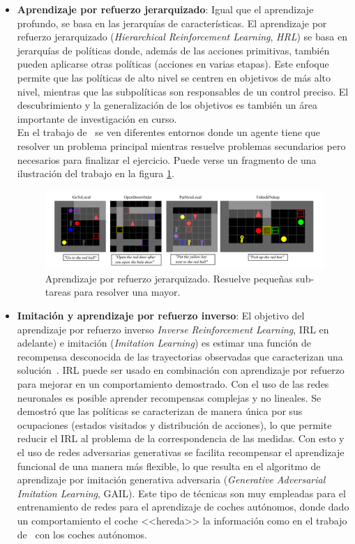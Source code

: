 \begin{itemize}
    \item \textbf{Aprendizaje por refuerzo jerarquizado}: Igual que el aprendizaje profundo, se basa en las jerarquías de características. El aprendizaje por refuerzo jerarquizado (\textit{Hierarchical Reinforcement Learning}, \textit{HRL}) se basa en jerarquías de políticas donde, además de las acciones primitivas, también pueden aplicarse otras políticas (acciones en varias etapas). Este enfoque permite que las políticas de alto nivel se centren en objetivos de más alto nivel, mientras que las subpolíticas son responsables de un control preciso. El descubrimiento y la generalización de los objetivos es también un área importante de investigación en curso.\\
    
    En el trabajo de~\cite{hrl} se ven diferentes entornos donde un agente tiene que resolver un problema principal mientras resuelve problemas secundarios pero necesarios para finalizar el ejercicio. Puede verse un fragmento de una ilustración del trabajo en la figura \ref{fig:hrl}.\\

    \begin{figure}[!ht]
        \centering \includegraphics[width=0.9\columnwidth]{./figures/chapter_2/hrl.png}
        \caption{Aprendizaje por refuerzo jerarquizado. Resuelve pequeñas sub-tareas para resolver una mayor.}\label{fig:hrl}
    \end{figure}

    \item \textbf{Imitación y aprendizaje por refuerzo inverso}: El objetivo del aprendizaje por refuerzo inverso \textit{Inverse Reinforcement Learning}, IRL en adelante) e imitación (\textit{Imitation Learning}) es estimar una función de recompensa desconocida de las trayectorias observadas que caracterizan una solución~\cite{mohamed_medhat}. IRL puede ser usado en combinación con aprendizaje por refuerzo para mejorar en un comportamiento demostrado. Con el uso de las redes neuronales es posible aprender recompensas complejas y no lineales. Se demostró que las políticas se caracterizan de manera única por sus ocupaciones (estados visitados y distribución de acciones), lo que permite reducir el IRL al problema de la correspondencia de las medidas. Con esto y el uso de redes adversarias generativas se facilita recompensar el aprendizaje funcional de una manera más flexible, lo que resulta en el algoritmo de aprendizaje por imitación generativa adversaria (\textit{Generative Adversarial Imitation Learning}, GAIL). Este tipo de técnicas son muy empleadas para el entrenamiento de redes para el aprendizaje de coches autónomos, donde dado un comportamiento el coche <<hereda>> la información como en el trabajo de~\cite{oliver_cameron} con los coches autónomos.\\
    

\end{itemize}
